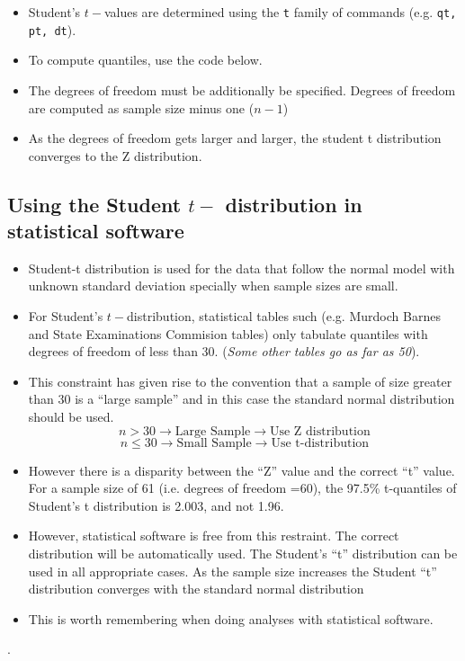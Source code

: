 \documentclass[]{report}
\begin{document}
\begin{itemize}
\item Student's $t-$values are determined using the \texttt{t} family of commands (e.g. \texttt{qt, pt, dt}).
\item To compute quantiles, use the code below.
\item The degrees of freedom must be additionally be specified. Degrees of freedom are computed as sample size minus one ($n-1$)
\item As the degrees of freedom gets larger and larger, the student t distribution converges to the Z distribution.

\end{itemize}




\subsection{Using the Student $t-$ distribution in statistical software}

\begin{itemize}
\item Student-t distribution is used for the data that follow the normal model with unknown standard deviation
specially when sample sizes are small.

\item For Student’s $t-$distribution, statistical tables such (e.g. Murdoch Barnes and State Examinations Commision tables) only tabulate quantiles with degrees of freedom of less than 30. (\textit{Some other tables go as far as 50}).
\item This constraint has given rise to the convention that a sample of size greater than 30 is a “large sample” and in this case the standard normal distribution should be used.
\[  n > 30 \rightarrow \mbox{Large Sample} \rightarrow \mbox{Use Z distribution} \]
\[  n \leq 30 \rightarrow \mbox{Small Sample} \rightarrow \mbox{Use t-distribution} \]

\item However there is a disparity between the “Z” value and the correct “t” value. For a sample size of 61 (i.e. degrees of freedom =60), the 97.5\% t-quantiles of Student's t distribution is 2.003, and not 1.96.

\item However, statistical software is free from this restraint. The correct distribution will be automatically used. The Student’s “t” distribution  can be used in all appropriate cases. As the sample size increases the Student “t” distribution converges with the standard normal distribution

\item This is worth remembering when doing analyses with statistical software.
\end{itemize}
.
\end{document}
